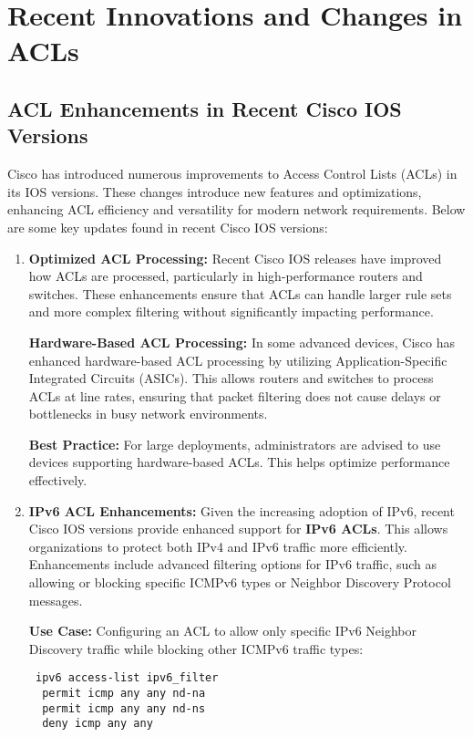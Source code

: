 \documentclass[11pt,a4paper]{article}
\begin{document}
\section*{Recent Innovations and Changes in ACLs}
    \subsection*{ACL Enhancements in Recent Cisco IOS Versions}
        Cisco has introduced numerous improvements to Access Control Lists (ACLs) in its IOS versions. These changes introduce new features and optimizations, enhancing ACL efficiency and versatility for modern network requirements. Below are some key updates found in recent Cisco IOS versions:~\cite{Enhancements}
            \begin{enumerate}
                \item \textbf{Optimized ACL Processing:} Recent Cisco IOS releases have improved how ACLs are processed, particularly in high-performance routers and switches. These enhancements ensure that ACLs can handle larger rule sets and more complex filtering without significantly impacting performance.

                \textbf{Hardware-Based ACL Processing:} In some advanced devices, Cisco has enhanced hardware-based ACL processing by utilizing Application-Specific Integrated Circuits (ASICs). This allows routers and switches to process ACLs at line rates, ensuring that packet filtering does not cause delays or bottlenecks in busy network environments.

                \textbf{Best Practice:} For large deployments, administrators are advised to use devices supporting hardware-based ACLs. This helps optimize performance effectively.


                \item \textbf{IPv6 ACL Enhancements:} Given the increasing adoption of IPv6, recent Cisco IOS versions provide enhanced support for \textbf{IPv6 ACLs}. This allows organizations to protect both IPv4 and IPv6 traffic more efficiently. Enhancements include advanced filtering options for IPv6 traffic, such as allowing or blocking specific ICMPv6 types or Neighbor Discovery Protocol messages.

                \textbf{Use Case:} Configuring an ACL to allow only specific IPv6 Neighbor Discovery traffic while blocking other ICMPv6 traffic types:
\begin{lstlisting}
 ipv6 access-list ipv6_filter
  permit icmp any any nd-na
  permit icmp any any nd-ns
  deny icmp any any
\end{lstlisting}


\end{enumerate}
\end{document}

